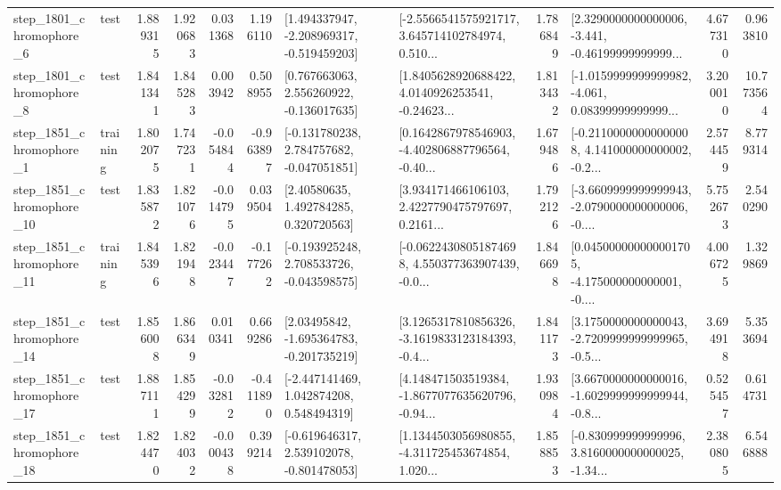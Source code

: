 \begin{tabular}{llrrrrllrlrr}
  step\_1801\_chromophore\_6 &      test &      1.889315 &    1.920683 &      0.031368 &  1.196110 &   [1.494337947, -2.208969317, -0.519459203] &  [-2.5566541575921717, 3.645714102784974, 0.510... &       1.786849 &  [2.3290000000000006, -3.441, -0.46199999999999... &            4.677310 &          0.963810 \\
  step\_1801\_chromophore\_8 &      test &      1.841341 &    1.845283 &      0.003942 &  0.508955 &    [0.767663063, 2.556260922, -0.136017635] &  [1.8405628920688422, 4.0140926253541, -0.24623... &       1.813432 &  [-1.0159999999999982, -4.061, 0.08399999999999... &            3.200010 &         10.773564 \\
  step\_1851\_chromophore\_1 &  training &      1.802075 &    1.747231 &     -0.054844 & -0.963897 &   [-0.131780238, 2.784757682, -0.047051851] &  [0.1642867978546903, -4.402806887796564, -0.40... &       1.679486 &  [-0.21100000000000008, 4.141000000000002, -0.2... &            2.574459 &          8.779314 \\
 step\_1851\_chromophore\_10 &      test &      1.835872 &    1.821076 &     -0.014795 &  0.039504 &      [2.40580635, 1.492784285, 0.320720563] &  [3.934171466106103, 2.4227790475797697, 0.2161... &       1.792126 &  [-3.6609999999999943, -2.0790000000000006, -0.... &            5.752673 &          2.540290 \\
 step\_1851\_chromophore\_11 &  training &      1.845396 &    1.821948 &     -0.023447 & -0.177262 &   [-0.193925248, 2.708533726, -0.043598575] &  [-0.06224308051874698, 4.550377363907439, -0.0... &       1.846698 &  [0.045000000000001705, -4.175000000000001, -0.... &            4.006725 &          1.329869 \\
 step\_1851\_chromophore\_14 &      test &      1.856008 &    1.866349 &      0.010341 &  0.669286 &    [2.03495842, -1.695364783, -0.201735219] &  [3.1265317810856326, -3.1619833123184393, -0.4... &       1.841173 &  [3.1750000000000043, -2.7209999999999965, -0.5... &            3.694918 &          5.353694 \\
 step\_1851\_chromophore\_17 &      test &      1.887111 &    1.854299 &     -0.032812 & -0.411890 &    [-2.447141469, 1.042874208, 0.548494319] &  [4.148471503519384, -1.8677077635620796, -0.94... &       1.930984 &  [3.6670000000000016, -1.6029999999999944, -0.8... &            0.525457 &          0.614731 \\
 step\_1851\_chromophore\_18 &      test &      1.824470 &    1.824032 &     -0.000438 &  0.399214 &   [-0.619646317, 2.539102078, -0.801478053] &  [1.1344503056980855, -4.311725453674854, 1.020... &       1.858853 &  [-0.830999999999996, 3.8160000000000025, -1.34... &            2.380805 &          6.546888 \\

\end{tabular}

